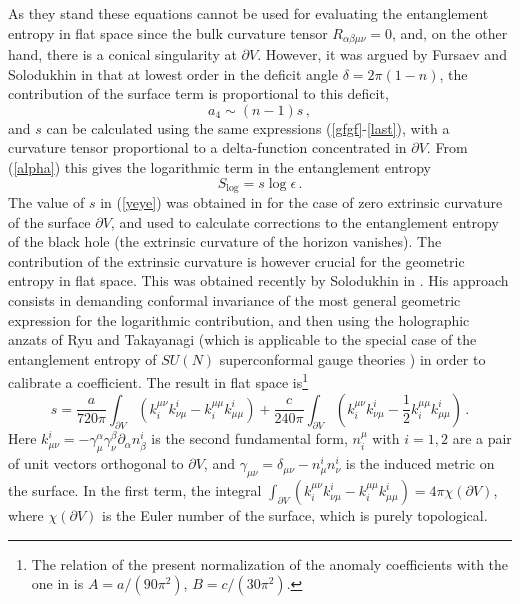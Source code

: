 \documentclass[11pt]{article}
\begin{document}
As they stand these equations cannot be used for evaluating the entanglement entropy in flat space since the bulk curvature tensor $R_{\alpha \beta \mu \nu}=0$, and, on the other hand, there is a conical singularity at $\partial V$. 
 However, it was argued by Fursaev and Solodukhin in \cite{dos} that at lowest order in the deficit angle $\delta=2\pi(1-n)$, the contribution of the surface term is proportional to this deficit,
 \begin{equation}
 a_4\sim (n-1) s\,,\label{yeye}
 \end{equation}
 and $s$ can be calculated using the same expressions (\ref{gfgf}-\ref{last}), with a curvature tensor proportional to a delta-function concentrated in $\partial V$. 
 From (\ref{alpha}) this gives the logarithmic term in the entanglement entropy
 \begin{equation}
 S_{\log}=s \log \epsilon\,.
 \end{equation}
 The value of $s$ in (\ref{yeye}) was obtained in \cite{dos} for the case of zero extrinsic curvature of the surface $\partial V$, and used to calculate corrections to the entanglement entropy of the black hole \cite{dos,cases} (the extrinsic curvature of the horizon vanishes). The contribution of the extrinsic curvature is however crucial for the geometric entropy in flat space. This was obtained recently by Solodukhin in \cite{una}.  His approach consists in demanding conformal invariance of the most general geometric expression for the logarithmic contribution, and then using the holographic anzats of Ryu and Takayanagi (which is applicable to the special case of the entanglement entropy of $SU(N)$ superconformal gauge theories  \cite{hkernel}) in order to calibrate a coefficient. The result in flat space is\footnote{The relation of the present normalization of the anomaly coefficients with the one in \cite{una} is $A=a/(90 \pi^2)$, $B=c/(30 \pi^2)$.} \cite{una}
\begin{equation}
s=\frac{a}{720 \pi} \int_{\partial V}(k_i^{\mu \nu}k^i_{\nu \mu} - k_i^{\mu \mu}k^i_{\mu \mu}) +\frac{c}{240 \pi}   \int_{\partial V}(k_i^{\mu \nu}k^i_{\nu \mu} -\frac{1}{2} k_i^{\mu \mu}k^i_{\mu \mu})\,.\label{turti}
\end{equation}
Here  $k^i_{\mu\nu}=-\gamma^\alpha_\mu \gamma^\beta_\nu \partial_\alpha n^i_\beta$ is the second fundamental form, $n^\mu_i$ with $i=1,2$ are a pair of unit vectors orthogonal to $\partial V$, and $\gamma_{\mu\nu}=\delta_{\mu\nu}-n^i_\mu n^i_\nu$ is the induced metric on the surface. In the first term, the integral $\int_{\partial V}(k_i^{\mu \nu}k^i_{\nu \mu}- k_i^{\mu \mu}k^i_{\mu \mu})=4\pi \chi (\partial V)$, where $\chi (\partial V)$ is the Euler number of the surface, which is purely topological.  
\end{document}

